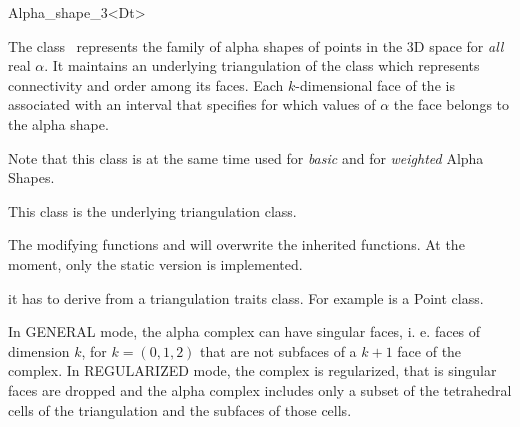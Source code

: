 \begin{ccRefClass} {Alpha_shape_3<Dt>}

\ccDefinition

The class \ccClassTemplateName\ represents the family of
alpha shapes of points in the 3D space for {\em all} real
$\alpha$. It maintains an  underlying triangulation 
of the class  which
represents connectivity and order among its faces. Each
$k$-dimensional face of the  is associated with
an interval that specifies for which values of $\alpha$ the face
belongs to the alpha shape. 

Note that this class is at the same time used for {\em basic} and
for {\em weighted} Alpha Shapes.



\ccInheritsFrom


This class is the underlying triangulation class.

The modifying functions  and  will overwrite
the inherited functions. At the moment, only the static version is implemented.

\ccTypes
{}
\ccThreeToTwo

it has to derive from a triangulation traits class.  
For example  is a Point class. 







{ In GENERAL mode, the alpha complex  can have singular faces,
 i. e. faces of dimension $k$, for $k=(0,1,2)$
that are not subfaces of a $k+1$ face of the complex.
In  REGULARIZED mode, the complex is regularized, that is
singular faces are dropped and the alpha complex 
includes only a subset of the tetrahedral cells 
of the triangulation and the subfaces of those cells.}



\end{ccRefClass}

